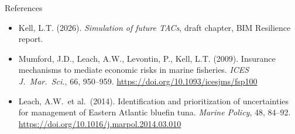 \documentclass[12pt,aspectratio=169]{beamer}
\begin{document}
\begin{frame}{References}
  \footnotesize
  \begin{itemize}
    \item Kell, L.T. (2026). \textit{Simulation of future TACs}, draft chapter, BIM Resilience report.
    \item Mumford, J.D., Leach, A.W., Levontin, P., Kell, L.T. (2009). Insurance mechanisms to mediate economic risks in marine fisheries. \textit{ICES J.\ Mar.\ Sci.}, 66, 950--959. \url{https://doi.org/10.1093/icesjms/fsp100}
    \item Leach, A.W.\ et al.\ (2014). Identification and prioritization of uncertainties for management of Eastern Atlantic bluefin tuna. \textit{Marine Policy}, 48, 84--92. \url{https://doi.org/10.1016/j.marpol.2014.03.010}
  \end{itemize}
\end{frame}
\end{document}
